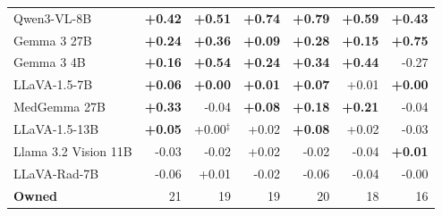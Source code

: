 \begin{table}[htbp]
\begin{tabular}{lrrrrrr}
Qwen3-VL-8B & \cellcolor{cfSlate4}\textbf{+0.42} & \cellcolor{cfSlate4}\textbf{+0.51} & \cellcolor{cfSlate4}\textbf{+0.74} & \cellcolor{cfSlate4}\textbf{+0.79} & \cellcolor{cfSlate4}\textbf{+0.59} & \cellcolor{cfSlate4}\textbf{+0.43} \\
Gemma 3 27B & \cellcolor{cfSlate3}\textbf{+0.24} & \cellcolor{cfSlate4}\textbf{+0.36} & \cellcolor{cfSlate2}\textbf{+0.09} & \cellcolor{cfSlate4}\textbf{+0.28} & \cellcolor{cfSlate3}\textbf{+0.15} & \cellcolor{cfSlate4}\textbf{+0.75} \\
Gemma 3 4B & \cellcolor{cfSlate3}\textbf{+0.16} & \cellcolor{cfSlate4}\textbf{+0.54} & \cellcolor{cfSlate3}\textbf{+0.24} & \cellcolor{cfSlate4}\textbf{+0.34} & \cellcolor{cfSlate4}\textbf{+0.44} & \cellcolor{cfTerra4}-0.27 \\
LLaVA-1.5-7B & \cellcolor{cfSlate2}\textbf{+0.06} & \cellcolor{cfSlate1}\textbf{+0.00} & \cellcolor{cfSlate1}\textbf{+0.01} & \cellcolor{cfSlate2}\textbf{+0.07} & \cellcolor{cfSlate1}+0.01 & \cellcolor{cfSlate1}\textbf{+0.00} \\
MedGemma 27B & \cellcolor{cfSlate4}\textbf{+0.33} & \cellcolor{cfTerra2}-0.04 & \cellcolor{cfSlate2}\textbf{+0.08} & \cellcolor{cfSlate3}\textbf{+0.18} & \cellcolor{cfSlate3}\textbf{+0.21} & \cellcolor{cfTerra2}-0.04 \\
LLaVA-1.5-13B & \cellcolor{cfSlate2}\textbf{+0.05} & \cellcolor{cfSlate1}+0.00$^{\ddagger}$ & \cellcolor{cfSlate1}+0.02 & \cellcolor{cfSlate2}\textbf{+0.08} & \cellcolor{cfSlate1}+0.02 & \cellcolor{cfTerra2}-0.03 \\
Llama 3.2 Vision 11B & \cellcolor{cfTerra2}-0.03 & \cellcolor{cfTerra2}-0.02 & \cellcolor{cfSlate2}+0.02 & \cellcolor{cfTerra1}-0.02 & \cellcolor{cfTerra2}-0.04 & \cellcolor{cfSlate1}\textbf{+0.01} \\
LLaVA-Rad-7B & \cellcolor{cfTerra2}-0.06 & \cellcolor{cfSlate1}+0.01 & \cellcolor{cfTerra2}-0.02 & \cellcolor{cfTerra2}-0.06 & \cellcolor{cfTerra2}-0.04 & \cellcolor{cfTerra1}-0.00 \\
\midrule
\textbf{Owned} & 21 & 19 & 19 & 20 & 18 & 16 \\
\bottomrule
\end{tabular}
\end{table}

